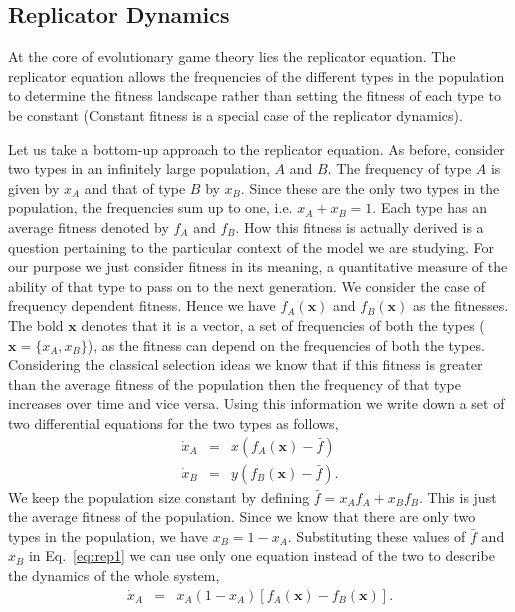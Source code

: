 \documentclass[oneside,11pt,a4paper]{book}
\begin{document}
\subsection{Replicator Dynamics}

At the core of evolutionary game theory lies the replicator equation. 
The replicator equation allows the frequencies of the different types in the population to determine the fitness landscape rather than setting the fitness of each type to be constant (Constant fitness is a special case of the replicator dynamics).

Let us take a bottom-up approach to the replicator equation.
As before, consider two types in an infinitely large population, $A$ and $B$.
The frequency of type $A$ is given by $x_A$ and that of type $B$ by $x_B$.
Since these are the only two types in the population, the frequencies sum up to one, i.e. $x_A + x_B = 1$.
Each type has an average fitness denoted by $f_A$ and $f_B$.
How this fitness is actually derived is a question pertaining to the particular context of the model we are studying.
For our purpose we just consider fitness in its meaning, a quantitative measure of the ability of that type to pass on to the next generation.
We consider the case of frequency dependent fitness.
Hence we have $f_A (\mathbf{x})$ and $f_B (\mathbf{x})$ as the fitnesses.
The bold $\mathbf{x}$ denotes that it is a vector, a set of frequencies of both the types ($\mathbf{x} = \{x_A,x_B\}$), as the fitness can depend on the frequencies of both the types.
Considering the classical selection ideas we know that if this fitness is greater than the average fitness of the population then the frequency of that type increases over time and vice versa.
Using this information we write down a set of two differential equations for the two types as follows,
%
\begin{eqnarray}
\label{eq:rep1}
\dot{x}_A &=& x \left(f_A (\mathbf{x}) -\bar{f} \right) \\
\dot{x}_B &=& y \left(f_B (\mathbf{x}) - \bar{f} \right).
\end{eqnarray}
%
We keep the population size constant by defining $\bar{f} = x_A f_A + x_B f_B$.
This is just the average fitness of the population.
Since we know that there are only two types in the population, we have $x_B=1-x_A$.
Substituting these values of $\bar{f}$ and $x_B$ in Eq.\ \eqref{eq:rep1} we can use only one equation instead of the two to describe the dynamics of the whole system,
%
\begin{eqnarray}
\dot{x}_A &=& x_A (1-x_A) \left[f_A (\mathbf{x}) - f_B (\mathbf{x}) \right].
\end{eqnarray}
\end{document}
